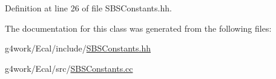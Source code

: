 Definition at line 26 of file S\-B\-S\-Constants.\-hh.



The documentation for this class was generated from the following files\-:\begin{DoxyCompactItemize}
\item 
g4work/\-Ecal/include/\hyperlink{_s_b_s_constants_8hh}{S\-B\-S\-Constants.\-hh}\item 
g4work/\-Ecal/src/\hyperlink{_s_b_s_constants_8cc}{S\-B\-S\-Constants.\-cc}\end{DoxyCompactItemize}
